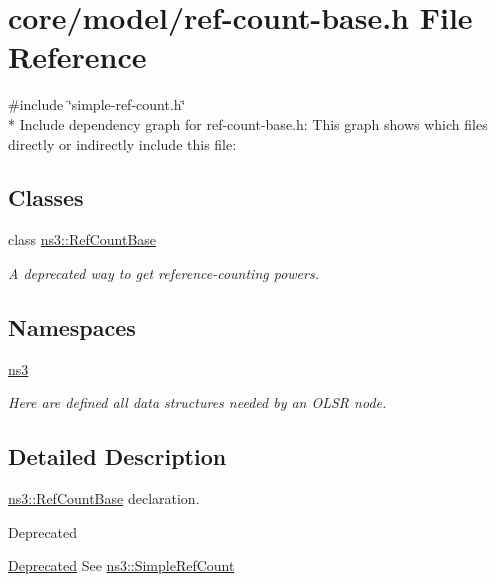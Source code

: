 \hypertarget{ref-count-base_8h}{}\section{core/model/ref-\/count-\/base.h File Reference}
\label{ref-count-base_8h}
{\ttfamily \#include \char`\"{}simple-\/ref-\/count.\+h\char`\"{}}\\*
Include dependency graph for ref-\/count-\/base.h\+:
This graph shows which files directly or indirectly include this file\+:
\subsection*{Classes}
\begin{DoxyCompactItemize}
\item 
class \hyperlink{classns3_1_1RefCountBase}{ns3\+::\+Ref\+Count\+Base}
\begin{DoxyCompactList}\small\item\em A deprecated way to get reference-\/counting powers. \end{DoxyCompactList}\end{DoxyCompactItemize}
\subsection*{Namespaces}
\begin{DoxyCompactItemize}
\item 
 \hyperlink{namespacens3}{ns3}
\begin{DoxyCompactList}\small\item\em Here are defined all data structures needed by an O\+L\+SR node. \end{DoxyCompactList}\end{DoxyCompactItemize}


\subsection{Detailed Description}
\hyperlink{classns3_1_1RefCountBase}{ns3\+::\+Ref\+Count\+Base} declaration. \begin{DoxyRefDesc}{Deprecated}
\item[\hyperlink{deprecated__deprecated000002}{Deprecated}]See \hyperlink{classns3_1_1SimpleRefCount}{ns3\+::\+Simple\+Ref\+Count} \end{DoxyRefDesc}
